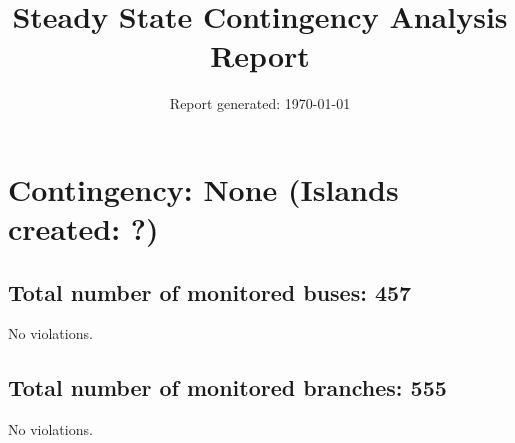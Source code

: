 \documentclass{article}%
\title{Steady State Contingency Analysis Report\vspace{-3ex}}%
\date{Report generated: \today\vspace{-2ex}}%
\begin{document}
%
\normalsize%
\maketitle%
\section*{Contingency: None (Islands created: ?)}%
\label{sec:ContingencyNone(Islandscreated?)}%
\subsection*{Total number of monitored buses: 457}%
\label{subsec:Totalnumberofmonitoredbuses457}%
No violations.

%
\subsection*{Total number of monitored branches: 555}%
\label{subsec:Totalnumberofmonitoredbranches555}%
No violations.

%
\end{document}
